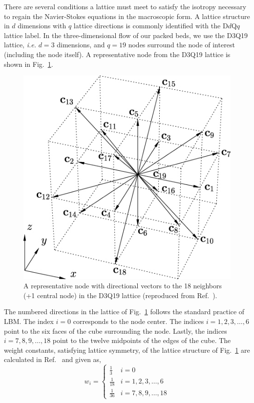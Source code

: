 There are several conditions a lattice must meet to satisfy the isotropy necessary to regain the Navier-Stokes equations in the macroscopic form.\cite{Viggen2009,Latt2007} A lattice structure in $d$ dimensions with $q$ lattice directions is commonly identified with the D$d$Q$q$ lattice label. In the three-dimensional flow of our packed beds, we use the D3Q19 lattice, \textit{i.e.} $d=3$ dimensions, and $q=19$ nodes surround the node of interest (including the node itself). A representative node from the D3Q19 lattice is shown in Fig.~\ref{fig:d3q19-lattice}.
\begin{figure}[t]
	\centering
	\includegraphics[width=\singleimagewidth]{figures/lbm/4193301.jpg}
	\caption{A representative node with directional vectors to the 18 neighbors (+1 central node) in the D3Q19 lattice (reproduced from Ref.~\cite{1742-5468-2010-01-P01018}).}\label{fig:d3q19-lattice}
\end{figure}

The numbered directions in the lattice of Fig.~\ref{fig:d3q19-lattice} follows the standard practice of LBM. The index $i=0$ corresponds to the node center. The indices $i = 1,2,3,\dots,6$ point to the six faces of the cube surrounding the node. Lastly, the indices $i=7,8,9,\dots,18$ point to the twelve midpoints of the edges of the cube. The weight constants, satisfying lattice symmetry, of the lattice structure of Fig.~\ref{fig:d3q19-lattice} are calculated in Ref.~\cite{Latt2007} and given as,
\begin{equation}\label{eq:d3q19-weights}
	w_i = \begin{cases}
	\frac{1}{3}			& i = 0\\
	\frac{1}{18} 		& i = 1,2,3,\dots,6\\
	\frac{1}{36}		& i = 7,8,9,\dots,18
	\end{cases}
\end{equation}

